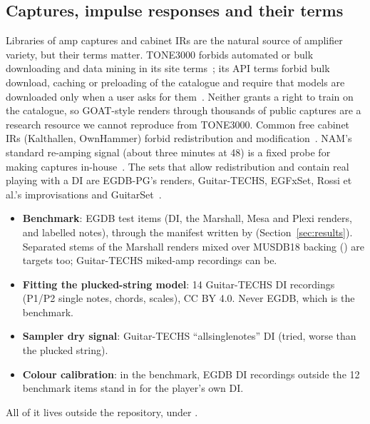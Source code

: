 \subsection{Captures, impulse responses and their terms}

Libraries of amp captures and cabinet IRs are the natural source of amplifier
variety, but their terms matter. TONE3000 forbids automated or bulk downloading
and data mining in its site terms~\cite{tone30002025terms}; its API terms forbid
bulk download, caching or preloading of the catalogue and require that models are
downloaded only when a user asks for them~\cite{tone30002026apiterms}. Neither
grants a right to train on the catalogue, so GOAT-style renders through thousands
of public captures are a research resource we cannot reproduce from TONE3000.
Common free cabinet IRs (Kalthallen, OwnHammer) forbid redistribution and
modification~\cite{kalthallenfree,ownhammereula}. NAM's standard re-amping
signal (about three minutes at 48\kHz) is a fixed probe for making captures
in-house~\cite{atkinsonndnam}. The sets that allow redistribution and contain real
playing with a DI are EGDB-PG's renders, Guitar-TECHS, EGFxSet, Rossi et al.'s
improvisations and GuitarSet~\cite{xi2018guitarset}.

\begin{inapp}
\begin{itemize}
\item \textbf{Benchmark}: EGDB test items (DI, the Marshall, Mesa and Plexi
  renders, and labelled notes), through the manifest 
  written by  (Section~\ref{sec:results}).
  Separated stems of the Marshall renders mixed over MUSDB18 backing
  () are targets too; Guitar-TECHS miked-amp
  recordings can be.
\item \textbf{Fitting the plucked-string model}: 14 Guitar-TECHS DI recordings
  (P1/P2 single notes, chords, scales), CC BY 4.0. Never EGDB, which is the
  benchmark.
\item \textbf{Sampler dry signal}: Guitar-TECHS ``allsinglenotes'' DI (tried,
  worse than the plucked string).
\item \textbf{Colour calibration}: in the benchmark, EGDB DI recordings outside
  the 12 benchmark items stand in for the player's own DI.
\end{itemize}
All of it lives outside the repository, under .
\end{inapp}

